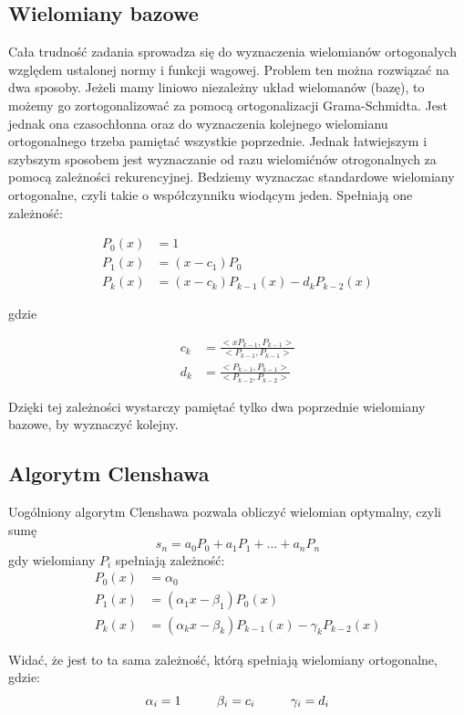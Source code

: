 \documentclass[11pt]{article}
\begin{document}
\subsection{Wielomiany bazowe}
Cała trudność zadania sprowadza się do wyznaczenia wielomianów ortogonalych względem ustalonej normy i funkcji wagowej. Problem ten można rozwiązać na dwa sposoby. Jeżeli mamy liniowo niezależny układ wielomanów (bazę), to możemy go zortogonalizować za pomocą ortogonalizacji Grama-Schmidta. Jest jednak ona czasochłonna oraz do wyznaczenia kolejnego wielomianu ortogonalnego trzeba pamiętać wszystkie poprzednie. Jednak łatwiejszym i szybszym sposobem jest wyznaczanie od razu wielomićnów otrogonalnych za pomocą zależności rekurencyjnej. Bedziemy wyznaczac standardowe wielomiany ortogonalne, czyli takie o współczynniku wiodącym jeden. Spełniają one zależność:

\begin{align*}
P_0(x) &= 1 \\
P_1(x) &= (x-c_1)P_0 \\
P_k(x) &= (x-c_k)P_{k-1}(x) - d_kP_{k-2}(x)
\end{align*}

gdzie 

\begin{align*}
c_k &= \frac{<xP_{k-1}, P_{k-1}>}{<P_{k-1},P_{k-1}>} \\
d_k &= \frac{<P_{k-1},P_{k-1}>}{<P_{k-2},P_{k-2}>}
\end{align*}

Dzięki tej zależności wystarczy pamiętać tylko dwa poprzednie wielomiany bazowe, by wyznaczyć kolejny.


\subsection{Algorytm Clenshawa}
Uogólniony algorytm Clenshawa pozwala obliczyć wielomian optymalny, czyli sumę
\begin{equation*}
s_n = a_0P_0 + a_1P_1 + \dots + a_nP_n
\end{equation*}
gdy wielomiany $P_i$ spełniają zależność:
\begin{align*}
P_0(x) &= \alpha_0 \\
P_1(x) &= (\alpha_1 x- \beta_1)P_0(x) \\
P_k(x) &= (\alpha_k x-\beta_k)P_{k-1}(x) - \gamma_kP_{k-2}(x)
\end{align*}

Widać, że jest to ta sama zależność, którą spełniają wielomiany ortogonalne, gdzie:
\begin{equation*}
\alpha_i = 1 \hspace{1 cm} \beta_i = c_i \hspace{1 cm} \gamma_i = d_i
\end{equation*}
\end{document}
